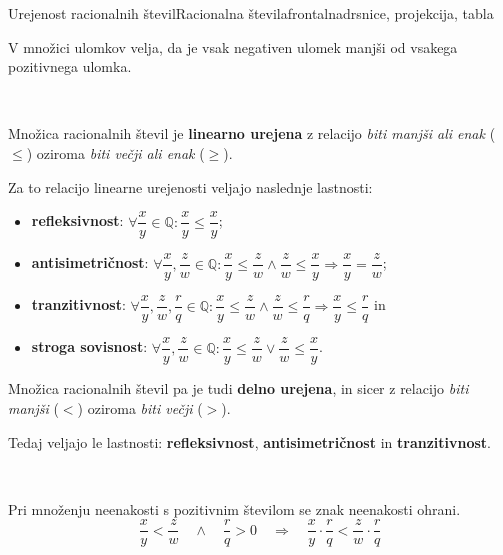 \begin{priprava}{7}{}{Urejenost racionalnih števil}{Racionalna števila}{frontalna}{drsnice, projekcija, tabla}
\begin{figure}[H]
    \end{figure}

    

    V množici ulomkov velja, da je vsak negativen ulomek manjši od vsakega pozitivnega ulomka.


    ~

    Množica racionalnih števil je \textbf{linearno urejena} z relacijo \textit{biti manjši ali enak} ($\leq$) oziroma \textit{biti večji ali enak} ($\geq$). 
    
    Za to relacijo linearne urejenosti veljajo naslednje lastnosti:

    \begin{itemize}
        \item \textbf{refleksivnost}: $\forall \dfrac{x}{y}\in\mathbb{Q}: \dfrac{x}{y}\leq\dfrac{x}{y}$;
        \item \textbf{antisimetričnost}: $\forall \dfrac{x}{y},\dfrac{z}{w}\in\mathbb{Q}: \dfrac{x}{y}\leq\dfrac{z}{w}  \land \dfrac{z}{w}\leq\dfrac{x}{y} \Rightarrow \dfrac{x}{y}=\dfrac{z}{w}$;
        \item \textbf{tranzitivnost}: $\forall \dfrac{x}{y},\dfrac{z}{w},\dfrac{r}{q}\in\mathbb{Q}: \dfrac{x}{y}\leq\dfrac{z}{w}  \land \dfrac{z}{w}\leq\dfrac{r}{q} \Rightarrow \dfrac{x}{y}\leq\dfrac{r}{q}$ in 
        \item \textbf{stroga sovisnost}: $\forall \dfrac{x}{y},\dfrac{z}{w}\in\mathbb{Q}: \dfrac{x}{y}\leq\dfrac{z}{w}  \lor \dfrac{z}{w}\leq\dfrac{x}{y}$.
    \end{itemize}



    Množica racionalnih števil pa je tudi \textbf{delno urejena}, in sicer z relacijo \textit{biti manjši} ($<$) oziroma \textit{biti večji} ($>$). 

    Tedaj veljajo le lastnosti: \textbf{refleksivnost}, \textbf{antisimetričnost} in \textbf{tranzitivnost}.


    ~

    Pri množenju neenakosti s pozitivnim številom se znak neenakosti ohrani.
    $$ \dfrac{x}{y}<\dfrac{z}{w} \quad \wedge \quad \dfrac{r}{q}>0 \quad \Rightarrow \quad \dfrac{x}{y}\cdot\dfrac{r}{q}<\dfrac{z}{w}\cdot\dfrac{r}{q} $$


\end{priprava}
